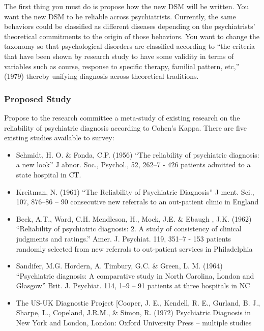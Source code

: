 \begin{refsection}
The first thing you must do is propose how the new DSM will be written. You want the new DSM to be reliable across psychiatrists. Currently, the same behaviors could be classified as different diseases depending on the psychiatrists' theoretical commitments to the origin of those behaviors. You want to change the taxonomy so that psychological disorders are classified according to “the criteria that have been shown by research study to have some validity in terms of variables such as course, response to specific therapy, familial pattern, etc,” (1979) thereby unifying diagnosis across theoretical traditions.

\subsubsection{Proposed Study}
\label{proposedstudy}

Propose to the research committee a meta-study of existing research on the reliability of psychiatric diagnosis according to Cohen's Kappa. There are five existing studies available to survey:

\begin{itemize}
\item Schmidt, H. O. \& Fonda, C.P. (1956) “The reliability of psychiatric diagnosis: a new look” J abnor. Soc., Psychol., 52, 262--7 - 426 patients admitted to a state hospital in CT.

\item Kreitman, N. (1961) “The Reliability of Psychiatric Diagnosis” J ment. Sci., 107, 876--86 – 90 consecutive new referrals to an out-patient clinic in England

\item Beck, A.T., Ward, C.H. Mendleson, H., Mock, J.E. \& Ebaugh , J.K. (1962) “Reliability of psychiatric diagnosis: 2. A study of consistency of clinical judgments and ratings.” Amer. J. Psychiat. 119, 351--7 - 153 patients randomly selected from new referrals to out-patient services in Philadelphia

\item Sandifer, M.G. Hordern, A. Timbury, G.C. \& Green, L. M. (1964) “Psychiatric diagnosis: A comparative study in North Carolina, London and Glasgow” Brit. J. Psychiat. 114, 1--9 – 91 patients at three hospitals in NC

\item The US-UK Diagnostic Project [Cooper, J. E., Kendell, R. E., Gurland, B. J., Sharpe, L., Copeland, J.R.M., \& Simon, R. (1972) Psychiatric Diagnosis in New York and London, London: Oxford University Press – multiple studies


\end{itemize}
\end{refsection}
